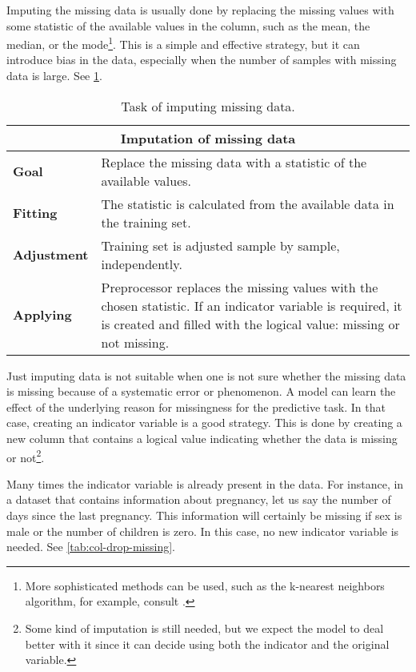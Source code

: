 Imputing the missing data is usually done by replacing the missing values with some
statistic of the available values in the column, such as the mean, the median, or the
mode\footnote{More sophisticated methods can be used, such as the k-nearest neighbors
algorithm, for example, consult .}.  This is a simple and
effective strategy, but it can introduce bias in the data, especially when the number of
samples with missing data is large.  See \cref{tab:imputation}.

\begin{table}\caption{Task of imputing missing data.}
  \centering
  \begin{tabular}{lp{6cm}}
    \toprule
    \multicolumn{2}{c}{\textbf{Imputation of missing data}} \\
    \midrule
    \textbf{Goal} &
      Replace the missing data with a statistic of the available values. \\
    \textbf{Fitting} &
      The statistic is calculated from the available data in the training set. \\
    \textbf{Adjustment} &
      Training set is adjusted sample by sample, independently. \\
    \textbf{Applying} &
      Preprocessor replaces the missing values with the chosen statistic. If an indicator
      variable is required, it is created and filled with the logical value:
      missing or not missing. \\
    \bottomrule
  \end{tabular}
  \label{tab:imputation}
\end{table}

Just imputing data is not suitable when one is not sure whether the missing data is
missing because of a systematic error or phenomenon.  A model can learn the effect of the
underlying reason for missingness for the predictive task.
In that case, creating an indicator variable is a good strategy.  This is done by creating
a new column that contains a logical value indicating whether the data is missing or
not\footnote{Some kind of imputation is still needed, but we expect the model to deal
better with it since it can decide using both the indicator and the original variable.}.

Many times the indicator variable is already present in the data.  For instance, in a
dataset that contains information about pregnancy, let us say the number of days since
the last pregnancy.  This information will certainly be missing if sex is male
or the number of children is zero.  In this case, no new indicator variable is needed.
See \cref{tab:col-drop-missing}.

